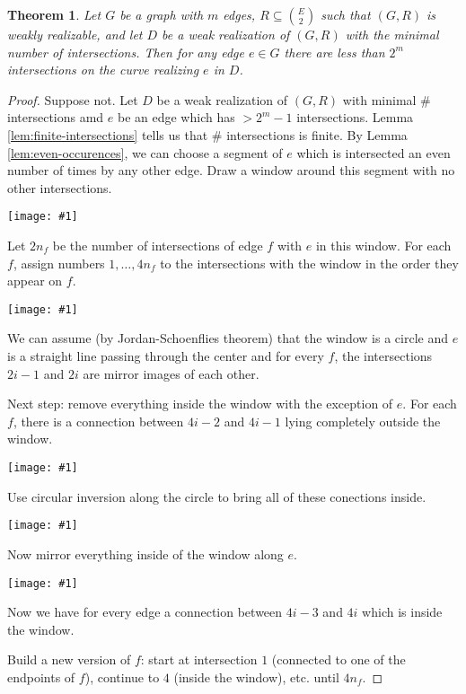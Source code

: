 \documentclass[12pt]{article}
\theoremstyle{plain} %
\newtheorem{theorem}{Theorem}
\newcommand{\image}[1]{\begin{center}\texttt{[image: \#1]}\end{center}}
\begin{document}
\begin{theorem}\label{thm:weak-realizability-bound}
    Let \(G\) be a graph with \(m\) edges, \(R \subseteq \binom{E}{2}\) such that \((G, R)\) is weakly realizable, and let \(D\) 
    be a weak realization of \((G, R)\) with the minimal number of intersections. Then for any edge \(e \in G\) 
    there are less than \(2^m\) intersections on the curve realizing \(e\) in \(D\).
\end{theorem}

\begin{proof}
Suppose not. Let \(D\) be a weak realization of \((G, R)\) with minimal \# intersections amd \(e\) 
be an edge which has \(> 2^m - 1\) intersections. Lemma \ref{lem:finite-intersections} tells us that \# intersections is finite.
By Lemma \ref{lem:even-occurences}, we can choose a segment of \(e\) which is intersected an even number of times by any other edge.
Draw a window around this segment with no other intersections. 

\image{images/figure-4.pdf}

Let \(2n_f\) be the number of intersections of edge \(f\) with \(e\) in this window.
For each \(f\), assign numbers \(1, \ldots, 4 n_f\) to the intersections with the window in the 
order they appear on \(f\). 

\image{images/figure-5.pdf}

We can assume (by Jordan-Schoenflies theorem) that the window is a circle and \(e\) is a straight line passing through the center
and for every \(f\), the intersections \(2i-1\) and \(2i\) are mirror images of each other.

Next step: remove everything inside the window with the exception of \(e\). For each \(f\), there is a connection between 
\(4i-2\) and \(4i-1\) lying completely outside the window. 

\image{images/figure-6.pdf}

Use circular inversion along the circle to bring all of these conections inside.

\image{images/figure-7.pdf}

Now mirror everything inside of the window along \(e\).

\image{images/figure-8.pdf}

Now we have for every edge a connection between \(4i-3\) and \(4i\) which is inside the window.

Build a new version of \(f\): start at intersection \(1\) (connected to one of the endpoints of \(f\)),
continue to \(4\) (inside the window), etc. until \(4 n_f\).


\end{proof}
\end{document}
